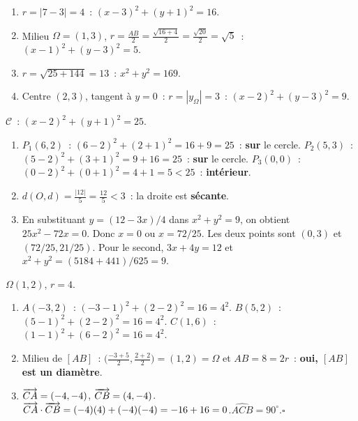 
\begin{enumerate}
  \item $r=|7-3|=4$~: $(x-3)^2+(y+1)^2=16$.
  \item Milieu $\Omega=(1,3)$, $r=\frac{AB}{2}=\frac{\sqrt{16+4}}{2}=\frac{\sqrt{20}}{2}=\sqrt{5}$~:
        $(x-1)^2+(y-3)^2=5$.
  \item $r=\sqrt{25+144}=13$~: $x^2+y^2=169$.
  \item Centre $(2,3)$, tangent \`a $y=0$~: $r=|y_\Omega|=3$~: $(x-2)^2+(y-3)^2=9$.
\end{enumerate}


$\mathcal{C}$~: $(x-2)^2+(y+1)^2=25$.
\begin{enumerate}
  \item $P_1(6,2)$~: $(6-2)^2+(2+1)^2=16+9=25$~: \textbf{sur} le cercle.
        $P_2(5,3)$~: $(5-2)^2+(3+1)^2=9+16=25$~: \textbf{sur} le cercle.
        $P_3(0,0)$~: $(0-2)^2+(0+1)^2=4+1=5<25$~: \textbf{int\'erieur}.
  \item $d(O,d)=\frac{|12|}{5}=\frac{12}{5}<3$~: la droite est \textbf{s\'ecante}.
  \item En substituant $y=(12-3x)/4$ dans $x^2+y^2=9$, on obtient
        $25x^2-72x=0$. Donc $x=0$ ou $x=72/25$.
        Les deux points sont $(0,3)$ et $(72/25,21/25)$.
        Pour le second, $3x+4y=12$ et $x^2+y^2=(5184+441)/625=9$.
\end{enumerate}


$\Omega(1,2)$, $r=4$.
\begin{enumerate}
  \item $A(-3,2)$~: $(-3-1)^2+(2-2)^2=16=4^2$.\checkmark\quad
        $B(5,2)$~: $(5-1)^2+(2-2)^2=16=4^2$.\checkmark\quad
        $C(1,6)$~: $(1-1)^2+(6-2)^2=16=4^2$.\checkmark
  \item Milieu de $[AB]$~: $\bigl(\frac{-3+5}{2},\frac{2+2}{2}\bigr)=(1,2)=\Omega$
        et $AB=8=2r$~: \textbf{oui, $[AB]$ est un diam\`etre}.
  \item $\overrightarrow{CA}=(-4,-4)$, $\overrightarrow{CB}=(4,-4)$.
        $\overrightarrow{CA}\cdot\overrightarrow{CB}=(-4)(4)+(-4)(-4)=-16+16=0$.\checkmark\quad $\widehat{ACB}=90^{\circ}$.\hfill$\square$
\end{enumerate}

